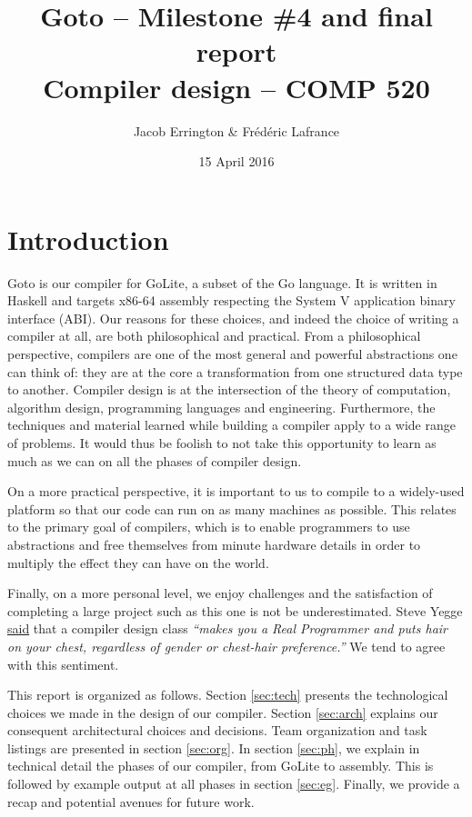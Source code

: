 \documentclass[letterpaper,11pt]{article}
\title{Goto -- Milestone \#4 and final report\\Compiler design -- COMP 520}
\author{Jacob Errington \& Fr\'ed\'eric Lafrance}
\date{15 April 2016}
\begin{document}
\maketitle

\section{Introduction}
\label{sec:intro}

Goto is our compiler for GoLite, a subset of the Go language. It is written in Haskell and targets x86-64 assembly respecting the System V application binary interface (ABI). Our reasons for these choices, and indeed the choice of writing a compiler at all, are both philosophical and practical. From a philosophical perspective, compilers are one of the most general and powerful abstractions one can think of: they are at the core a transformation from one structured data type to another. Compiler design is at the intersection of the theory of computation, algorithm design, programming languages and engineering. Furthermore, the techniques and material learned while building a compiler apply to a wide range of problems. It would thus be foolish to not take this opportunity to learn as much as we can on all the phases of compiler design.

On a more practical perspective, it is important to us to compile to a widely-used platform so that our code can run on as many machines as possible. This relates to the primary goal of compilers, which is to enable programmers to use abstractions and free themselves from minute hardware details in order to multiply the effect they can have on the world. 

Finally, on a more personal level, we enjoy challenges and the satisfaction of completing a large project such as this one is not be underestimated. Steve Yegge \href{http://steve-yegge.blogspot.ca/2007/06/rich-programmer-food.html}{said} that a compiler design class \emph{``makes you a Real Programmer and puts hair on your chest, regardless of gender or chest-hair preference.''} We tend to agree with this sentiment.

This report is organized as follows. Section \ref{sec:tech} presents the technological choices we made in the design of our compiler. Section \ref{sec:arch} explains our consequent architectural choices and decisions. Team organization and task listings are presented in section \ref{sec:org}. In section \ref{sec:ph}, we explain in technical detail the phases of our compiler, from GoLite to assembly. This is followed by example output at all phases in section \ref{sec:eg}. Finally, we provide a recap and potential avenues for future work.
\end{document}
